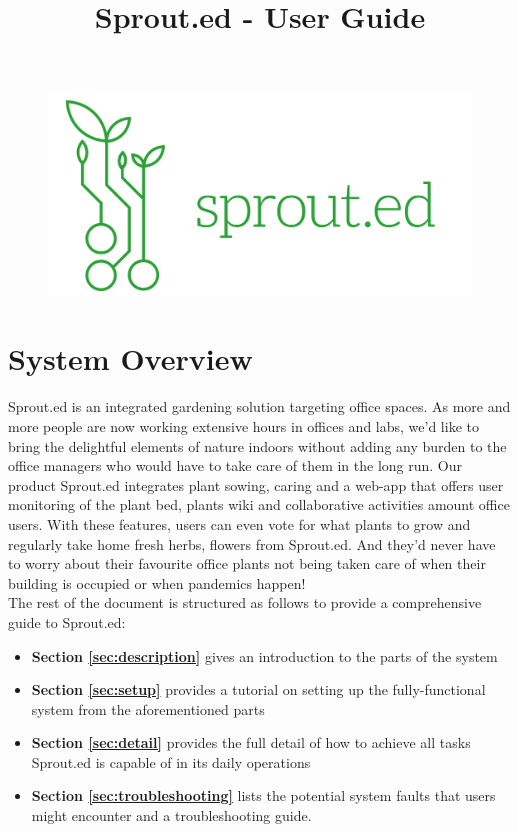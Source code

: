 \documentclass{article}
\title{Sprout.ed - User Guide}
\begin{document}
 

\maketitle{}

\begin{figure}[h]
    \centering
    \includegraphics[width=0.3\linewidth]{figs/sprouted_logo.png}
    \label{fig:logo}
\end{figure}



\section{System Overview} \label{sec:overview}
Sprout.ed is an integrated gardening solution targeting office spaces. 
As more and more people are now working extensive hours in offices and labs, we’d like to bring the delightful elements of nature indoors without adding any burden to the office managers who would have to take care of them in the long run.
Our product Sprout.ed integrates plant sowing, caring and a web-app that offers user monitoring of the plant bed, plants wiki and collaborative activities amount office users. With these features, users can even vote for what plants to grow and regularly take home fresh herbs, flowers from Sprout.ed. And they’d never have to worry about their favourite office plants not being taken care of when their building is occupied or when pandemics happen! \\

The rest of the document is structured as follows to provide a comprehensive guide to Sprout.ed:
\begin{itemize}
    \item \textbf{Section \ref{sec:description}} gives an introduction to the parts of the system
    \item \textbf{Section \ref{sec:setup}} provides a tutorial on setting up the fully-functional system from the aforementioned parts
    \item \textbf{Section \ref{sec:detail}} provides the full detail of how to achieve all tasks Sprout.ed is capable of in its daily operations
    \item \textbf{Section \ref{sec:troubleshooting}} lists the potential system faults that users might encounter and a troubleshooting guide.
\end{itemize}
\end{document}
